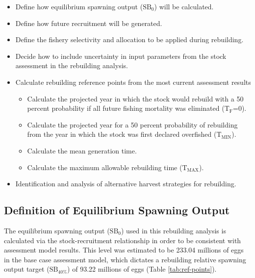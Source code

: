 \documentclass[11pt,
  english,
  a4paper,
]{article}
\begin{document}
\begin{itemize}
    \item Define how equilibrium spawning output ($\text{SB}_0$) will be calculated. 
    \item Define how future recruitment will be generated. 
    \item Define the fishery selectivity and allocation to be applied during rebuilding. 
    \item Decide how to include uncertainty in input parameters from the stock assessment in the rebuilding analysis. 
    \item Calculate rebuilding reference points from the most current assessment results 
    \begin{itemize}
        \item Calculate the projected year in which the stock would rebuild with a 50 percent probability if all future fishing mortality was eliminated ($\text{T}_\text{F}$=0).
        \item  Calculate the projected year for a 50 percent probability of rebuilding from the year in which the stock was first declared overfished ($\text{T}_\text{MIN}$). 
        \item Calculate the mean generation time. 
        \item Calculate the maximum allowable rebuilding time ($\text{T}_\text{MAX}$). 
    \end{itemize}
    \item Identification and analysis of alternative harvest strategies for rebuilding. 
\end{itemize}


\hypertarget{definition-of-equilibrium-spawning-output}{%
\subsection{Definition of Equilibrium Spawning Output}\label{definition-of-equilibrium-spawning-output}}

\leavevmode\tagmcend\tagstructend


The equilibrium spawning output ({\(\text{SB}_0\)\leavevmode\tagmcend\tagstructend}) used in this rebuilding analysis is calculated via the stock-recruitment relationship in order to be consistent with assessment model results. This level was estimated to be 233.04 millions of eggs in the base case assessment model, which dictates a rebuilding relative spawning output target ({\(\text{SB}_{40\%}\)\leavevmode\tagmcend\tagstructend}) of 93.22 millions of eggs (Table \ref{tab:ref-points}).
\end{document}
